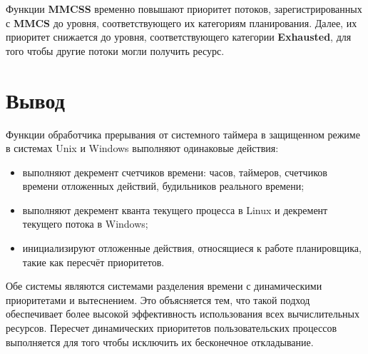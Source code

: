 Функции \textbf{MMCSS} временно повышают приоритет потоков, зарегистрированных с \textbf{MMCS} до уровня, соответствующего их категориям планирования. Далее, их приоритет снижается до уровня, соответствующего категории \textbf{Exhausted}, для того чтобы другие потоки могли получить ресурс.

\section*{Вывод}

Функции обработчика прерывания от системного таймера в защищенном режиме в системах Unix и Windows выполняют одинаковые действия:

\begin{itemize} 
	\item выполняют декремент счетчиков времени: часов, таймеров, счетчиков времени отложенных действий, будильников реального времени;
	\item выполняют декремент кванта текущего процесса в Linux и декремент текущего потока в Windows;
	\item инициализируют отложенные действия, относящиеся к работе планировщика, такие как пересчёт приоритетов.
\end{itemize} 

Обе системы являются системами разделения времени с динамическими приоритетами и вытеснением. Это объясняется тем, что такой подход обеспечивает более высокой эффективность использования всех вычислительных ресурсов. Пересчет динамических приоритетов пользовательских процессов выполняется для того чтобы исключить их бесконечное откладывание.


